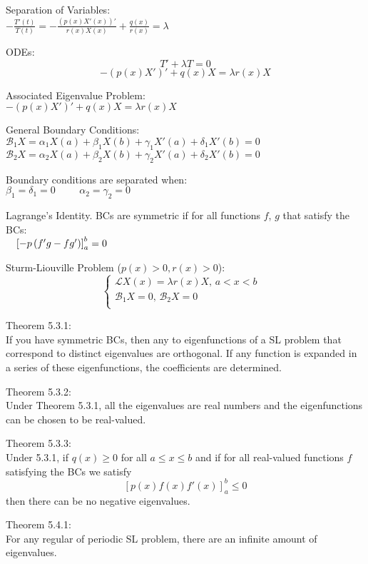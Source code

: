 \documentclass[12pt,landscape]{article}
\newcommand{\tab}{\hspace*{1em}}
\newcommand{\ds}{\displaystyle}
\theoremstyle{definition}
\begin{document}
\begin{multicols*}{3}
Separation of Variables:\\
\tab $\ds -\frac{T'(t)}{T(t)} = -\frac{(p(x)X'(x))'}{r(x)X(x)} + \frac{q(x)}{r(x)} = \lambda$

ODEs:
$$T' + \lambda T = 0$$
$$-(p(x)X')' + q(x)X = \lambda r(x)X$$

Associated Eigenvalue Problem:\\
\tab $-(p(x)X')' + q(x)X = \lambda r(x) X$

General Boundary Conditions:\\
\tab $\mathcal{B}_1X = \alpha_1 X(a) + \beta_1 X(b) + \gamma_1 X'(a) + \delta_1 X'(b) = 0$\\
\tab $\mathcal{B}_2X = \alpha_2 X(a) + \beta_2 X(b) + \gamma_2 X'(a) + \delta_2 X'(b) = 0$

Boundary conditions are separated when:\\
\tab $\beta_1 = \delta_1 = 0 \hspace{1cm} \alpha_2 = \gamma_2 = 0$

Lagrange's Identity. BCs are symmetric if for all functions $f$, $g$ that satisfy the BCs:\\
\tab $\tab \left[-p\left(f'g - fg'\right)\right]_a^b = 0$

Sturm-Liouville Problem ($p(x) > 0, r(x) > 0$):
\begin{equation*}
\begin{cases}
\mathcal{L}X(x) = \lambda r(x)X, \, a < x < b &\\
\mathcal{B}_1 X = 0, \,\mathcal{B}_2 X = 0&\\
\end{cases}
\end{equation*}

Theorem 5.3.1:\\
\tab If you have symmetric BCs, then any to eigenfunctions of a SL problem that correspond to distinct eigenvalues are orthogonal. If any function is expanded in a series of these eigenfunctions, the coefficients are determined.

Theorem 5.3.2:\\
\tab Under Theorem 5.3.1, all the eigenvalues are real numbers and the eigenfunctions can be chosen to be real-valued.

Theorem 5.3.3:\\
\tab Under 5.3.1, if $q(x) \geq 0$ for all $a \leq x \leq b$ and if for all real-valued functions $f$ satisfying the BCs we satisfy
$$[p(x)f(x)f'(x)]_a^b \leq 0$$
then there can be no negative eigenvalues.

Theorem 5.4.1:\\
\tab For any regular of periodic SL problem, there are an infinite amount of eigenvalues.


\end{multicols*}
\end{document}
